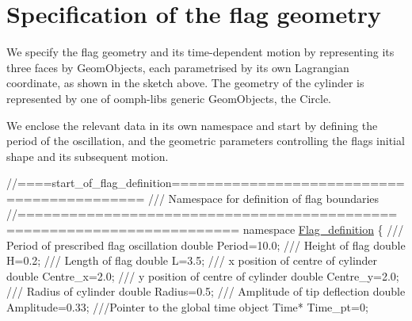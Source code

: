 

\hypertarget{index_leaflet}{}\section{Specification of the flag geometry}\label{index_leaflet}
We specify the flag geometry and its time-\/dependent motion by representing its three faces by {\ttfamily Geom\+Objects}, each parametrised by its own Lagrangian coordinate, as shown in the sketch above. The geometry of the cylinder is represented by one of {\ttfamily oomph-\/lib\textquotesingle{}s} generic {\ttfamily Geom\+Objects}, the {\ttfamily Circle}.

We enclose the relevant data in its own namespace and start by defining the period of the oscillation, and the geometric parameters controlling the flag\textquotesingle{}s initial shape and its subsequent motion.

 
\begin{DoxyCodeInclude}
\textcolor{comment}{//====start\_of\_flag\_definition===========================================}
\textcolor{comment}{/// Namespace for definition of flag boundaries}
\textcolor{comment}{}\textcolor{comment}{//=======================================================================}
\textcolor{keyword}{namespace }\hyperlink{namespaceFlag__definition}{Flag\_definition}
\{
\textcolor{comment}{}
\textcolor{comment}{ /// Period of prescribed flag oscillation}
\textcolor{comment}{} \textcolor{keywordtype}{double} Period=10.0;
\textcolor{comment}{}
\textcolor{comment}{ /// Height of flag}
\textcolor{comment}{} \textcolor{keywordtype}{double} H=0.2;
\textcolor{comment}{}
\textcolor{comment}{ /// Length of flag}
\textcolor{comment}{} \textcolor{keywordtype}{double} L=3.5;
   \textcolor{comment}{}
\textcolor{comment}{ /// x position of centre of cylinder}
\textcolor{comment}{} \textcolor{keywordtype}{double} Centre\_x=2.0;
\textcolor{comment}{}
\textcolor{comment}{ /// y position of centre of cylinder}
\textcolor{comment}{} \textcolor{keywordtype}{double} Centre\_y=2.0;
\textcolor{comment}{}
\textcolor{comment}{ /// Radius of cylinder}
\textcolor{comment}{} \textcolor{keywordtype}{double} Radius=0.5;
\textcolor{comment}{}
\textcolor{comment}{ /// Amplitude of tip deflection}
\textcolor{comment}{} \textcolor{keywordtype}{double} Amplitude=0.33;
\textcolor{comment}{}
\textcolor{comment}{ ///Pointer to the global time object}
\textcolor{comment}{} Time* Time\_pt=0;

\end{DoxyCodeInclude}


